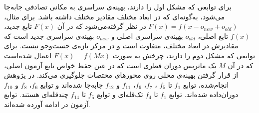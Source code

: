 \documentclass[12pt,a4paper]{article}
\theoremstyle{definition}
\theoremstyle{theorem}
\theoremstyle{definition}
\begin{document}
برای توابعی که مشکل اول را دارند، بهینه‌ی سراسری به مکانی تصادفی جابه‌جا می‌شود، به‌گونه‌ای که در ابعاد مختلف مقادیر مختلف داشته باشد. برای مثال، 
$F(x) = f(x - o_{new} + o_{old})$
در نظر گرفته‌‌می‌شود که در آن 
$F(x)$
تابع جدید، 
$f(x)$
تابع اصلی، 
$o_{old}$
بهینه‌ی سراسری اصلی و 
$o_{new}$
بهینه‌ی سراسری جدید است که مقادیرش در ابعاد مختلف، متفاوت است و در مرکز بازه‌ی جست‌وجو نیست. برای توابعی که مشکل دوم را دارند، چرخش به صورت 
$F(x) = f(Mx)$
اعمال شده‌است که در آن 
$M$
یک ماتریس دوران قطری است که در عین حفظ خواص تابع آزمون اصلی، از قرار گرفتن بهینه‌ی محلی روی محورهای مختصات جلوگیری می‌کند. در پژوهش انجام‌شده، توابع 
$f_1$
تا 
$f_5$
، 
$f_7$، 
$f_9$، 
$f_{11} $
و 
$f_{12} $
جابه‌جا شده‌اند و توابع 
$f_6$، 
$f_8 $
و 
$f_{10}$
دوران‌داده شده‌اند. 
توابع 
$f_1 $
تا 
$f_4 $
تک‌قله‌ای و توابع 
$f_5 $
تا 
$f_{14}$
چندقله‌ای هستند. 
توابع آزمون در ادامه آورده شده‌اند. 
\end{document}
